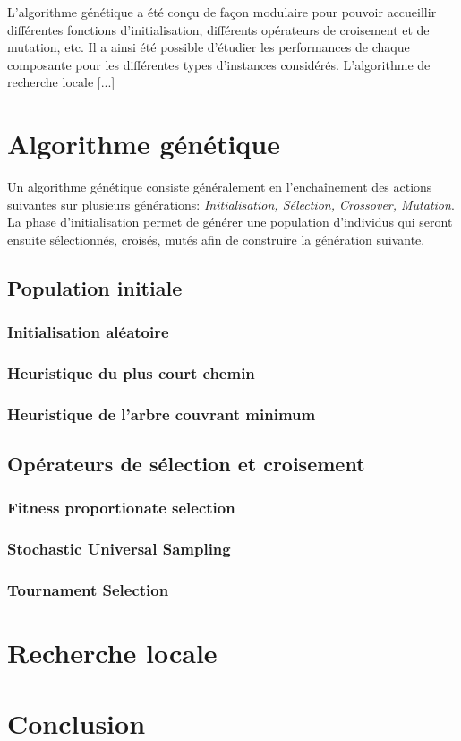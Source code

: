 \documentclass[10pt]{article}
\begin{document}
	L'algorithme génétique a été conçu de façon modulaire pour pouvoir accueillir différentes fonctions d'initialisation, différents opérateurs de croisement et de mutation, etc. Il a ainsi été possible d'étudier les performances de chaque composante pour les différentes types d'instances considérés. L'algorithme de recherche locale [...]
	
\section{Algorithme génétique}
	Un algorithme génétique consiste généralement en l'enchaînement des actions suivantes sur plusieurs générations: \textit{Initialisation, Sélection, Crossover, Mutation}. La phase d'initialisation permet de générer une population d'individus qui seront ensuite sélectionnés, croisés, mutés afin de construire la génération suivante.

	\subsection{Population initiale}
		\subsubsection{Initialisation aléatoire}
			
		\subsubsection{Heuristique du plus court chemin}
		\subsubsection{Heuristique de l'arbre couvrant minimum}

	\subsection{Opérateurs de sélection et croisement}
			
		\subsubsection{Fitness proportionate selection}
		\subsubsection{Stochastic Universal Sampling}
		\subsubsection{Tournament Selection}
	
	
\section{Recherche locale}
\section{Conclusion}
	
\end{document}
